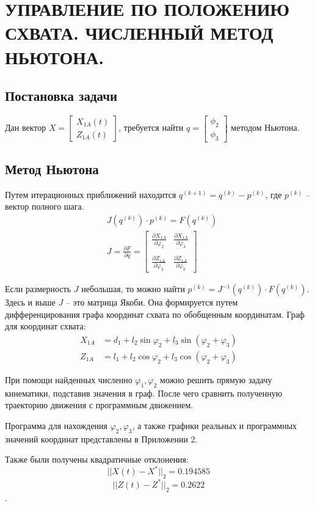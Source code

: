 \chapter{\MakeUppercase{ Управление по положению схвата. Численный метод Ньютона. }}

\section{Постановка задачи}
Дан вектор $ X = \begin{bmatrix}
    X_{1A}(t) \\ Z_{1A}(t)
\end{bmatrix} $, требуется найти $ q = \begin{bmatrix}
    \phi_2 \\ \phi_3
\end{bmatrix} $ методом Ньютона.

\section{Метод Ньютона}
Путем итерационных приближений находится $ q^{(k+1)}=q^{(k)}-p^{(k)} $, где $ p^{(k)} $ -- вектор полного шага.
\begin{align*}
    & J(q^{(k)}) \cdot p^{(k)} = F(q^{(k)}) \\
    & J = \frac{\partial F}{\partial q} = \begin{bmatrix}
        \frac{\partial X_{1A}}{\partial \varphi_2} & \frac{\partial X_{1A}}{\partial \varphi_3} \\ \\
        \frac{\partial Z_{1A}}{\partial \varphi_2} & \frac{\partial Z_{1A}}{\partial \varphi_3}
    \end{bmatrix}
\end{align*}

Если размерность $ J $ небольшая, то можно найти $ p^{(k)} = J^{-1}(q^{(k)}) \cdot F(q^{(k)}) $. Здесь и выше $ J $ -- это матрица Якоби. Она формируется путем дифференцирования графа координат схвата по обобщенным координатам. Граф для координат схвата:
\begin{align*}
    X_{1A}&=d_1+l_2\sin\varphi_2+l_3\sin{(\varphi_2+\varphi_3)} \\
    Z_{1A}&=l_1+l_2\cos\varphi_2+l_3\cos{(\varphi_2+\varphi_3)}
\end{align*}

При помощи найденных численно $ \varphi_1, \varphi_2 $ можно решить прямую задачу кинематики, подставив значения в граф. После чего сравнить полученную траекторию движения с программным движением.

Программа для нахождения $\varphi_2,\varphi_3$, а также графики реальных и программных значений координат представлены в Приложении 2.

Также были получены квадратичные отклонения: 
$$||X(t)-X^*||_2=0.194585$$
$$||Z(t)-Z^*||_2=0.2622$$.